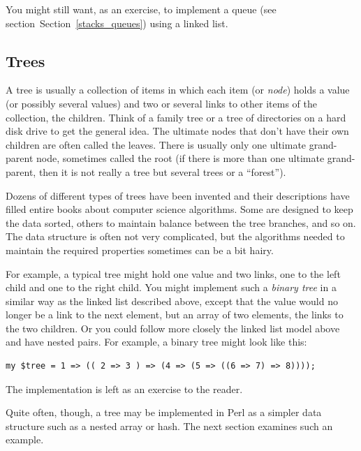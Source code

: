 You might still want, as an exercise, to implement a queue 
(see section~Section~\ref{stacks_queues}) using a linked list. 

\subsection{Trees}
\label{tree}

A tree is usually a collection of items in which each 
item (or \emph{node}) holds a value (or possibly 
several values) and two or several 
links to other items of the collection, the children. Think 
of a family tree or a tree of directories on a hard disk 
drive to get the general idea. The ultimate 
nodes that don't have their own children are often called 
the leaves. There is usually only one ultimate grand-parent 
node, sometimes called the root (if there is more than one 
ultimate grand-parent, then it is not really a tree but 
several trees or a ``forest'').

Dozens of different types of trees have been invented and 
their descriptions have filled entire books about computer 
science algorithms. Some are designed 
to keep the data sorted, others to maintain balance between 
the tree branches, and so on. The data structure is often 
not very complicated, but the algorithms needed to maintain the 
required properties sometimes can be a bit hairy.

For example, a 
typical tree might hold one value and two links, one to 
the left child and one to the right child. You 
might implement such a \emph{binary tree} in a similar way as the 
linked list described above, except that the value 
would no longer be a link to the next element, but an 
array of two elements, the links to the two children. 
Or you could follow more closely the linked list model 
above and have nested pairs. For example, a binary tree 
might look like this:

\begin{verbatim}
my $tree = 1 => (( 2 => 3 ) => (4 => (5 => ((6 => 7) => 8))));
\end{verbatim}

The implementation is left as an exercise to the reader. 

Quite often, though, a tree may be implemented in Perl 
as a simpler data structure such as a nested array or hash. 
The next section examines such an example.

